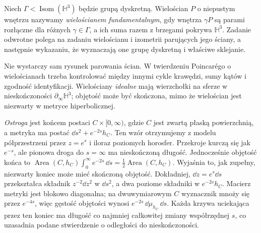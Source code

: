 \begin{definicja}
\label{def:thur-dop-wieloscian}
Niech $\Gamma<\operatorname{Isom}(\mathbb H^3)$ będzie grupą
dyskretną. Wielościan $P$ o niepustym wnętrzu nazywamy
\emph{wielościanem fundamentalnym}, gdy wnętrza $\gamma P$
są parami rozłączne dla różnych $\gamma\in\Gamma$,
a ich suma razem z brzegami pokrywa $\mathbb H^3$.
Zadanie odwrotne polega na zadaniu wielościanu i izometrii
parujących jego ściany, a następnie wykazaniu, że wyznaczają
one grupę dyskretną i właściwe sklejanie.
\end{definicja}

Nie wystarczy sam rysunek parowania ścian. W twierdzeniu
Poincarégo o wielościanach trzeba kontrolować między innymi
cykle krawędzi, sumy kątów i zgodność identyfikacji.
Wielościany \emph{idealne} mają wierzchołki na sferze
w nieskończoności $\partial_\infty\mathbb H^3$;
objętość może być skończona, mimo że wielościan
jest niezwarty w metryce hiperbolicznej.

\emph{Ostroga} jest końcem postaci $C\times[0,\infty)$,
gdzie $C$ jest zwartą płaską powierzchnią, a metryka ma postać
$\dd s^2+e^{-2s}h_C$. Ten wzór otrzymujemy z modelu
półprzestrzeni przez $z=e^s$ i iloraz poziomych horosfer.
Przekroje kurczą się jak $e^{-s}$, ale pionowa droga do
$s=\infty$ ma nieskończoną długość. Jednocześnie objętość
końca to $\operatorname{Area}(C,h_C)\int_0^\infty e^{-2s}\,\dd s
=\tfrac12\operatorname{Area}(C,h_C)$.
Wyjaśnia to, jak zupełny, niezwarty koniec może mieć skończoną objętość.
Dokładniej, $\dd z=e^s\dd s$ przekształca składnik
$z^{-2}\dd z^2$ w $\dd s^2$, a dwa poziome składniki
w $e^{-2s}h_C$. Macierz metryki jest blokowo diagonalna;
na dwuwymiarowym $C$ wyznacznik mnoży się przez $e^{-4s}$,
więc gęstość objętości wynosi $e^{-2s}\,\dd\mu_{h_C}\,\dd s$.
Każda krzywa uciekająca przez ten koniec ma długość co najmniej
całkowitej zmiany współrzędnej $s$, co uzasadnia podane
stwierdzenie o odległości do nieskończoności.

